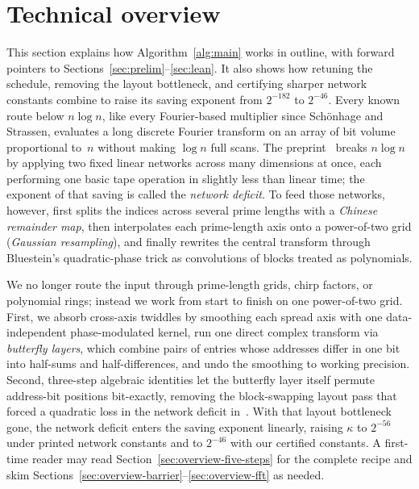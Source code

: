 \setlength{\textfloatsep}{6pt plus 2pt minus 2pt}
\setlength{\floatsep}{6pt plus 2pt minus 2pt}
\setlength{\intextsep}{3.5pt plus 2pt minus 3pt}
\setlength{\abovedisplayskip}{6.5pt plus 2pt minus 3pt}
\setlength{\belowdisplayskip}{6.5pt plus 2pt minus 3pt}
\section{Technical overview}\label{sec:overview}

This section explains how Algorithm~\ref{alg:main} works in outline, with forward pointers to Sections~\ref{sec:prelim}--\ref{sec:lean}. It also shows how retuning the schedule, removing the layout bottleneck, and certifying sharper network constants combine to raise its saving exponent from $2^{-182}$ to $2^{-46}$. Every known route below $n\log n$, like every Fourier-based multiplier since Sch\"onhage and Strassen, evaluates a long discrete Fourier transform on an array of bit volume proportional to~$n$ without making $\log n$ full scans. The preprint~\cite{OAI26} breaks $n\log n$ by applying two fixed linear networks across many dimensions at once, each performing one basic tape operation in slightly less than linear time; the exponent of that saving is called the \emph{network deficit}. To feed those networks, however, \cite{OAI26} first splits the indices across several prime lengths with a \emph{Chinese remainder map}, then interpolates each prime-length axis onto a power-of-two grid (\emph{Gaussian resampling}), and finally rewrites the central transform through Bluestein's quadratic-phase trick as convolutions of blocks treated as polynomials.

We no longer route the input through prime-length grids, chirp factors, or polynomial rings; instead we work from start to finish on one power-of-two grid. First, we absorb cross-axis twiddles by smoothing each spread axis with one data-independent phase-modulated kernel, run one direct complex transform via \emph{butterfly layers}, which combine pairs of entries whose addresses differ in one bit into half-sums and half-differences, and undo the smoothing to working precision. Second, three-step algebraic identities let the butterfly layer itself permute address-bit positions bit-exactly, removing the block-swapping layout pass that forced a quadratic loss in the network deficit in~\cite{OAI26}. With that layout bottleneck gone, the network deficit enters the saving exponent linearly, raising $\kappa$ to $2^{-56}$ under printed network constants and to $2^{-46}$ with our certified constants. A first-time reader may read Section~\ref{sec:overview-five-steps} for the complete recipe and skim Sections~\ref{sec:overview-barrier}--\ref{sec:overview-fft} as needed.

